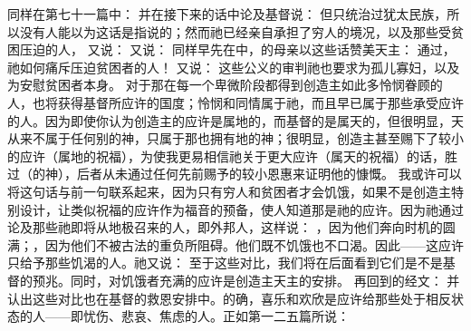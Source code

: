  同样在第七十一篇中： 并在接下来的话中论及基督说： 但只统治过犹太民族，所以没有人能以为这话是指说的；然而祂已经亲自承担了穷人的境况，以及那些受贫困压迫的人， 又说： 又说： 同样早先在中，的母亲以这些话赞美天主：  通过，祂如何痛斥压迫贫困者的人！  又说：  这些公义的审判祂也要求为孤儿寡妇，以及为安慰贫困者本身。  对于那在每一个卑微阶段都得到创造主如此多怜悯眷顾的人，也将获得基督所应许的国度；怜悯和同情属于祂，而且早已属于那些承受应许的人。因为即使你认为创造主的应许是属地的，而基督的是属天的，但很明显，天从来不属于任何别的神，只属于那也拥有地的神；很明显，创造主甚至赐下了较小的应许（属地的祝福），为使我更易相信祂关于更大应许（属天的祝福）的话，胜过（的神），后者从未通过任何先前赐予的较小恩惠来证明他的慷慨。  我或许可以将这句话与前一句联系起来，因为只有穷人和贫困者才会饥饿，如果不是创造主特别设计，让类似祝福的应许作为福音的预备，使人知道那是祂的应许。因为祂通过论及那些祂即将从地极召来的人，即外邦人，这样说：  ，因为他们奔向时机的圆满；，因为他们不被古法的重负所阻碍。他们既不饥饿也不口渴。因此——这应许只给予那些饥渴的人。祂又说：  至于这些对比，我们将在后面看到它们是不是基督的预兆。同时，对饥饿者充满的应许是创造主天主的安排。  再回到的经文：  并认出这些对比也在基督的救恩安排中。的确，喜乐和欢欣是应许给那些处于相反状态的人——即忧伤、悲哀、焦虑的人。正如第一二五篇所说： 